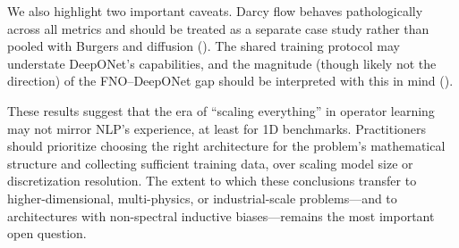 \documentclass[11pt]{article}
\begin{document}
We also highlight two important caveats. Darcy flow behaves
pathologically across all metrics and should be treated as a separate
case study rather than pooled with Burgers and diffusion
().
The shared training protocol may understate DeepONet's capabilities,
and the magnitude (though likely not the direction) of the
FNO--DeepONet gap should be interpreted with this in mind
().

These results suggest that the era of ``scaling everything'' in
operator learning may not mirror NLP's experience, at least for
1D benchmarks.
Practitioners should prioritize choosing the right
architecture for the problem's mathematical structure and
collecting sufficient training data, over scaling model size or
discretization resolution.
The extent to which these conclusions transfer to higher-dimensional,
multi-physics, or industrial-scale problems---and to architectures
with non-spectral inductive biases---remains the most important
open question.
\end{document}
